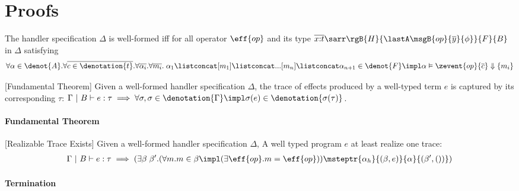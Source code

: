 \newpage
\section{Proofs}\label{sec:tech:proof}

\begin{definition}
  \label{lemma:built-in-typing}
  The handler specification $\Delta$ is well-formed iff for all operator $\eff{op}$ and its type $\overline{x{:}t} \sarr \rgB{H}{\lastA\msgB{op}{\overline{y}}{\phi}}{F}{B}$ in $\Delta$ satisfying
{\small\begin{align*}
    \forall \alpha \in \denot{A}. \forall \overline{c \in \denotation{t}}. \forall \overline{\alpha_i}. \forall \overline{m_i}.\; \alpha_1 \listconcat [m_1] \listconcat ... [m_{n}] \listconcat \alpha_{n+1} \in \denot{F} \impl \alpha \vDash \zevent{op}{\overline{c}} \Downarrow \{m_i\}
\end{align*}}
\end{definition}

\begin{theorem}\label{theorem:fundamental}[Fundamental Theorem] Given
  a well-formed handler specification $\Delta$,
    the trace of effects produced by a well-typed term
    $e$ is captured by its corresponding \PAT $\tau$:
  $\Gamma ~|~ B \vdash e : \tau \implies \forall \sigma, \sigma \in
    \denotation{\Gamma} \impl \sigma(e) \in
    \denotation{\sigma(\tau)}$.
\end{theorem}

\paragraph{Fundamental Theorem} 

\begin{lemma}\label{lemma:realizable}[Realizable Trace Exists] Given a well-formed handler specification $\Delta$, A well typed program $e$ at least realize one trace:
 {\small\begin{align*} 
 \Gamma ~|~ B \vdash e : \tau \implies 
    (\exists \beta\;\beta'. (\forall m. m \in \beta \impl (\exists \eff{op}. m = \eff{op}) ) \msteptr{\alpha_h}{(\beta, e)}{\alpha}{(\beta', ())})
\end{align*}}
\end{lemma}

\paragraph{Termination} 


